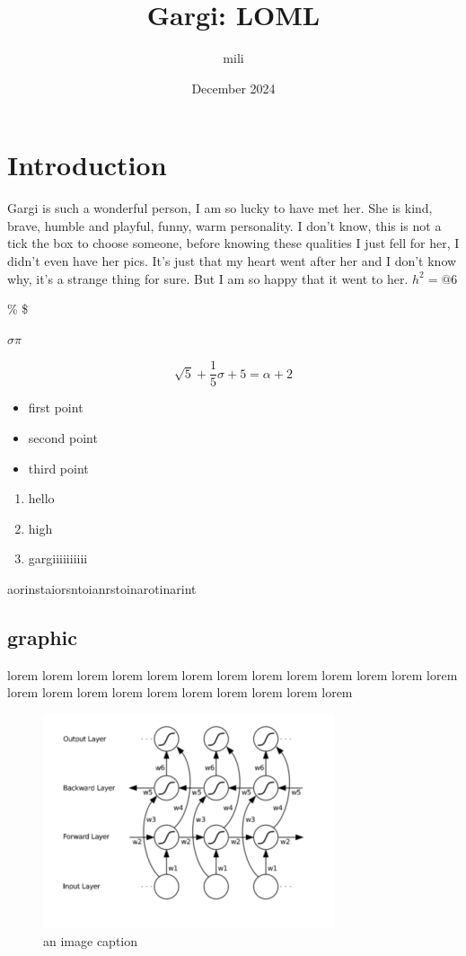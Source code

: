 \documentclass{article}
\title{Gargi: LOML}
\author{mili}
\date{December 2024}
\begin{document}
\maketitle

\section{Introduction}
Gargi is such a wonderful person, I am so lucky to have met her. She is kind, brave, humble and playful, funny, warm personality. I don't know, this is not a tick the box to choose someone, before knowing these qualities I just fell for her, I didn't even have her pics. It's just that my heart went after her and I don't know why, it's a strange thing for sure. But I am so happy that it went to her. $h^2 = @6$

\% \$

$\sigma \pi$

\begin{equation}
    \sqrt{5} + \frac{1}{5}\sigma + 5 = \alpha + 2
\end{equation}

\begin{itemize}
    \item first point
    \item second point
    \item third point
\end{itemize}

\begin{enumerate}
    \item hello
    \item high
    \item gargiiiiiiiiii
\end{enumerate}

aorinstaiorsntoianrstoinarotinarint

\subsection{graphic}
lorem lorem lorem lorem lorem lorem lorem lorem lorem lorem lorem lorem lorem lorem lorem lorem lorem lorem lorem lorem lorem lorem lorem

\begin{figure}
    \centering
    \includegraphics{assets/image1.png}
    \caption{an image caption}
    \label{fig: nothing to see here}
\end{figure}
\end{document}
